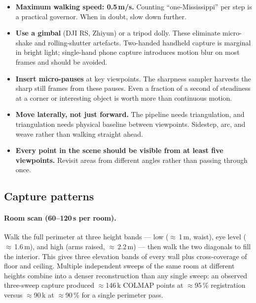 \begin{itemize}
  \item \textbf{Maximum walking speed: 0.5\,m/s.}  Counting ``one-Mississippi''
        per step is a practical governor.  When in doubt, slow down further.
  \item \textbf{Use a gimbal} (DJI RS, Zhiyun) or a tripod dolly.  These
        eliminate micro-shake and rolling-shutter artefacts.  Two-handed
        handheld capture is marginal in bright light; single-hand phone capture
        introduces motion blur on most frames and should be avoided.
  \item \textbf{Insert micro-pauses} at key viewpoints.  The sharpness
        sampler harvests the sharp still frames from these pauses.  Even a
        fraction of a second of steadiness at a corner or interesting object is
        worth more than continuous motion.
  \item \textbf{Move laterally, not just forward.}  The pipeline needs
        triangulation, and triangulation needs physical baseline between
        viewpoints.  Sidestep, arc, and weave rather than walking straight ahead.
  \item \textbf{Every point in the scene should be visible from at least five
        viewpoints.}  Revisit areas from different angles rather than passing
        through once.
\end{itemize}

\subsection{Capture patterns}
\label{sec:pb-patterns}

\paragraph{Room scan (60--120\,s per room).}
Walk the full perimeter at three height bands — low ($\approx$\,1\,m, waist),
eye level ($\approx$\,1.6\,m), and high (arms raised, $\approx$\,2.2\,m) —
then walk the two diagonals to fill the interior.  This gives three elevation
bands of every wall plus cross-coverage of floor and ceiling.  Multiple
independent sweeps of the same room at different heights combine into a denser
reconstruction than any single sweep: an observed three-sweep capture produced
$\approx$146\,k COLMAP points at $\approx$95\,\% registration versus $\approx$90\,k
at $\approx$90\,\% for a single perimeter pass.

